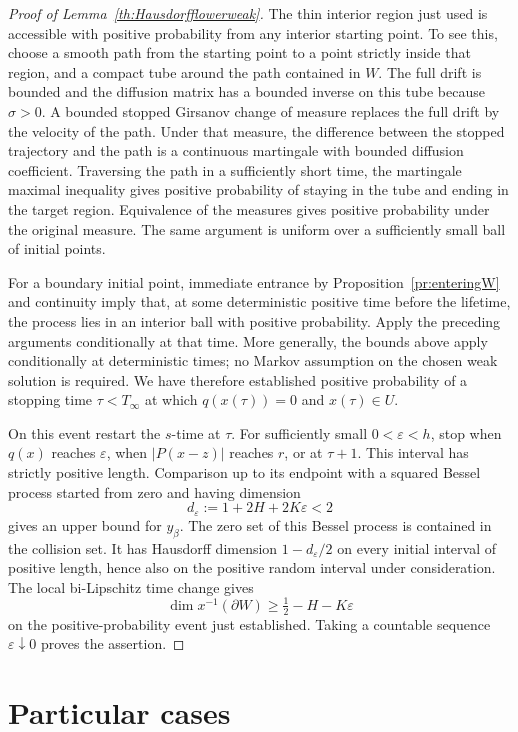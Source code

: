 \documentclass{article}
\numberwithin{equation}{section}
\theoremstyle{plain}
\begin{document}
\begin{proof}[Proof of Lemma~\ref{th:Hausdorfflowerweak}]
The thin interior region just used is accessible with positive probability from any interior starting point. To see this, choose a smooth path from the starting point to a point strictly inside that region, and a compact tube around the path contained in $W$. The full drift is bounded and the diffusion matrix has a bounded inverse on this tube because $\sigma>0$. A bounded stopped Girsanov change of measure replaces the full drift by the velocity of the path. Under that measure, the difference between the stopped trajectory and the path is a continuous martingale with bounded diffusion coefficient. Traversing the path in a sufficiently short time, the martingale maximal inequality gives positive probability of staying in the tube and ending in the target region. Equivalence of the measures gives positive probability under the original measure. The same argument is uniform over a sufficiently small ball of initial points.

For a boundary initial point, immediate entrance by Proposition~\ref{pr:enteringW} and continuity imply that, at some deterministic positive time before the lifetime, the process lies in an interior ball with positive probability. Apply the preceding arguments conditionally at that time. More generally, the bounds above apply conditionally at deterministic times; no Markov assumption on the chosen weak solution is required. We have therefore established positive probability of a stopping time $\tau<T_\infty$ at which $q(x(\tau))=0$ and $x(\tau)\in U$.

On this event restart the $s$-time at $\tau$. For sufficiently small $0<\varepsilon<h$, stop when $q(x)$ reaches $\varepsilon$, when $|P(x-z)|$ reaches $r$, or at $\tau+1$. This interval has strictly positive length. Comparison up to its endpoint with a squared Bessel process started from zero and having dimension
\[
 d_\varepsilon:=1+2H+2K\varepsilon<2
\]
gives an upper bound for $y_\beta$. The zero set of this Bessel process is contained in the collision set. It has Hausdorff dimension $1-d_\varepsilon/2$ on every initial interval of positive length, hence also on the positive random interval under consideration. The local bi-Lipschitz time change gives
\[
 \dim x^{-1}(\partial W)\geq\tfrac12-H-K\varepsilon
\]
on the positive-probability event just established. Taking a countable sequence $\varepsilon\downarrow0$ proves the assertion.
    \end{proof}
        
\section{Particular cases}\label{sec:examples}
\end{document}
